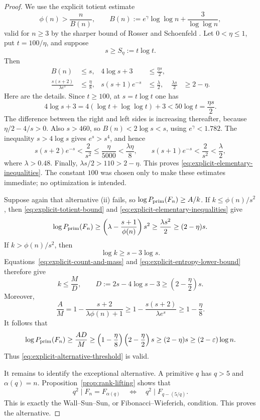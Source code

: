 \begin{proof}
We use the explicit totient estimate
\begin{equation}
\label{eq:explicit-totient-bound}
 \phi(n)>\frac{n}{B(n)},
 \qquad
 B(n):=e^\gamma\log\log n+\frac3{\log\log n},
\end{equation}
valid for $n\geq3$ by the sharper bound of Rosser and Schoenfeld
\cite[Theorem~15]{RosserSchoenfeld1962ApproximateFormulas}.
Let $0<\eta\leq1$, put $t=100/\eta$, and suppose
\[
 s\geq S_\eta:=t\log t.
\]
Then
\begin{equation}
\label{eq:explicit-elementary-inequalities}
 \begin{aligned}
 B(n)&\leq s,
 &4\log s+3&\leq\frac{\eta s}{2},\\
 \frac{s(s+2)}{\lambda e^s}&\leq\frac\eta8,
 &s(s+1)e^{-s}&\leq\frac\lambda2,
 &\frac{\lambda s}{2}&\geq2-\eta.
 \end{aligned}
\end{equation}
Here are the details.  Since $t\geq100$, at $s=t\log t$ one has
\[
 4\log s+3
 =4(\log t+\log\log t)+3<50\log t=\frac{\eta s}{2}.
\]
The difference between the right and left sides is increasing thereafter,
because $\eta/2-4/s>0$.  Also $s>460$, so
$B(n)<2\log s<s$, using $e^\gamma<1.782$.  The inequality
$s>4\log s$ gives $e^s>s^4$, and hence
\[
 s(s+2)e^{-s}<\frac2{s^2}\leq\frac{\eta}{5000}
 <\frac{\lambda\eta}{8},
 \qquad
 s(s+1)e^{-s}<\frac2{s^2}<\frac\lambda2,
\]
where $\lambda>0.48$.  Finally, $\lambda s/2>110>2-\eta$.
This proves \eqref{eq:explicit-elementary-inequalities}.  The constant
$100$ was chosen only to make these estimates immediate; no optimization
is intended.

Suppose again that alternative \textup{(ii)} fails, so
$\log P_{\rm prim}(F_n)\geq A/k$.  If
$k\leq\phi(n)/s^2$, then
\eqref{eq:explicit-totient-bound} and
\eqref{eq:explicit-elementary-inequalities} give
\[
 \log P_{\rm prim}(F_n)
 \geq\left(\lambda-\frac{s+1}{\phi(n)}\right)s^2
 \geq\frac{\lambda s^2}{2}
 \geq(2-\eta)s.
\]
If $k>\phi(n)/s^2$, then
\[
 \log k\geq s-3\log s.
\]
Equations~\eqref{eq:explicit-count-and-mass} and
\eqref{eq:explicit-entropy-lower-bound} therefore give
\[
 k\leq\frac{M}{D},
 \qquad
 D:=2s-4\log s-3\geq\left(2-\frac\eta2\right)s.
\]
Moreover,
\[
 \frac AM
 =1-\frac{s+2}{\lambda\phi(n)+1}
 \geq1-\frac{s(s+2)}{\lambda e^s}
 \geq1-\frac\eta8.
\]
It follows that
\[
 \log P_{\rm prim}(F_n)
 \geq\frac{AD}{M}
 \geq\left(1-\frac\eta8\right)
       \left(2-\frac\eta2\right)s
 \geq(2-\eta)s
 \geq(2-\varepsilon)\log n.
\]
Thus \eqref{eq:explicit-alternative-threshold} is valid.

It remains to identify the exceptional alternative.  A primitive $q$ has
$q>5$ and $\alpha(q)=n$.  Proposition~\ref{prop:rank-lifting} shows that
\[
 q^2\mid F_n=F_{\alpha(q)}
 \quad\Longleftrightarrow\quad
 q^2\mid F_{q-(5/q)}.
\]
This is exactly the Wall--Sun--Sun, or Fibonacci--Wieferich, condition.
This proves the alternative.
\end{proof}

